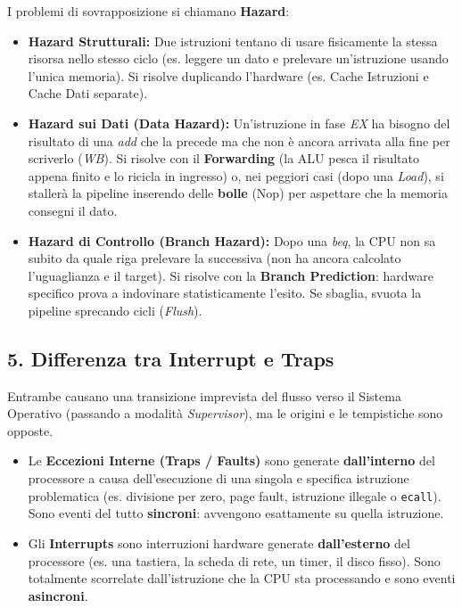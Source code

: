 \documentclass[12pt, a4paper]{article}
\begin{document}
I problemi di sovrapposizione si chiamano \textbf{Hazard}:
\begin{itemize}
    \item \textbf{Hazard Strutturali:} Due istruzioni tentano di usare fisicamente la stessa risorsa nello stesso ciclo (es. leggere un dato e prelevare un'istruzione usando l'unica memoria). Si risolve duplicando l'hardware (es. Cache Istruzioni e Cache Dati separate).
    \item \textbf{Hazard sui Dati (Data Hazard):} Un'istruzione in fase \textit{EX} ha bisogno del risultato di una \textit{add} che la precede ma che non è ancora arrivata alla fine per scriverlo (\textit{WB}). Si risolve con il \textbf{Forwarding} (la ALU pesca il risultato appena finito e lo ricicla in ingresso) o, nei peggiori casi (dopo una \textit{Load}), si stallerà la pipeline inserendo delle \textbf{bolle} (Nop) per aspettare che la memoria consegni il dato.
    \item \textbf{Hazard di Controllo (Branch Hazard):} Dopo una \textit{beq}, la CPU non sa subito da quale riga prelevare la successiva (non ha ancora calcolato l'uguaglianza e il target). Si risolve con la \textbf{Branch Prediction}: hardware specifico prova a indovinare statisticamente l'esito. Se sbaglia, svuota la pipeline sprecando cicli (\textit{Flush}).
\end{itemize}

\subsection{5. Differenza tra Interrupt e Traps}
Entrambe causano una transizione imprevista del flusso verso il Sistema Operativo (passando a modalità \textit{Supervisor}), ma le origini e le tempistiche sono opposte.
\begin{itemize}
    \item Le \textbf{Eccezioni Interne (Traps / Faults)} sono generate \textbf{dall'interno} del processore a causa dell'esecuzione di una singola e specifica istruzione problematica (es. divisione per zero, page fault, istruzione illegale o \texttt{ecall}). Sono eventi del tutto \textbf{sincroni}: avvengono esattamente su quella istruzione.
    \item Gli \textbf{Interrupts} sono interruzioni hardware generate \textbf{dall'esterno} del processore (es. una tastiera, la scheda di rete, un timer, il disco fisso). Sono totalmente scorrelate dall'istruzione che la CPU sta processando e sono eventi \textbf{asincroni}.
\end{itemize}
\end{document}
